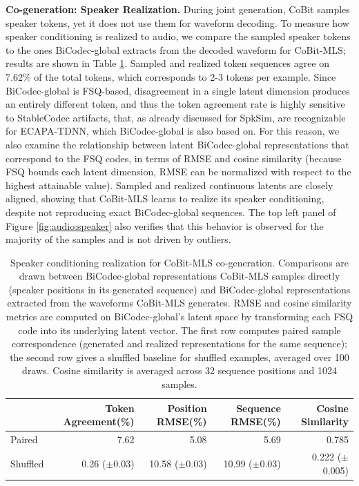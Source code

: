 \textbf{Co-generation: Speaker Realization.} During joint generation, CoBit samples speaker tokens, yet it does not use them for waveform decoding. To measure how speaker conditioning is realized to audio, we compare the sampled speaker tokens to the ones BiCodec-global extracts from the decoded waveform for CoBit-MLS; results are shown in Table \ref{tab:audio:realized-conditioning}. Sampled and realized token sequences agree on 7.62\% of the total tokens, which corresponds to 2-3 tokens per example. Since BiCodec-global is FSQ-based, disagreement in a single latent dimension produces an entirely different token, and thus the token agreement rate is highly sensitive to StableCodec artifacts, that, as already discussed for SpkSim, are recognizable for ECAPA-TDNN, which BiCodec-global is also based on. For this reason, we also examine the relationship between latent BiCodec-global representations that correspond to the FSQ codes, in terms of RMSE and cosine similarity (because FSQ bounds each latent dimension, RMSE can be normalized with respect to the highest attainable value). Sampled and realized continuous latents are closely aligned, showing that CoBit-MLS learns to realize its speaker conditioning, despite not reproducing exact BiCodec-global sequences. The top left panel of Figure \ref{fig:audio:speaker} also verifies that this behavior is observed for the majority of the samples and is not driven by outliers.  

\begin{table}[t]
\centering
\small
\setlength{\tabcolsep}{4.5pt}
\begin{tabular}{lrrrr}
\toprule
& \textbf{Token Agreement(\%)} & \textbf{Position RMSE(\%)} & \textbf{Sequence RMSE(\%)} & \textbf{Cosine Similarity}\\
\midrule
Paired & 7.62 & 5.08 & 5.69 & 0.785 \\
Shuffled & 0.26 ($\pm$0.03) & 10.58 ($\pm$0.03) & 10.99 ($\pm$0.03) & 0.222 ($\pm$0.005) \\
\bottomrule
\end{tabular}
\caption{Speaker conditioning realization for CoBit-MLS co-generation. Comparisons are drawn between BiCodec-global representations CoBit-MLS samples directly (speaker positions in its generated sequence) and BiCodec-global representations extracted from the waveforms CoBit-MLS generates. RMSE and cosine similarity metrics are computed on BiCodec-global's latent space by transforming each FSQ code into its underlying latent vector. The first row computes paired sample correspondence (generated and realized representations for the same sequence); the second row gives a shuffled baseline for shuffled examples, averaged over 100 draws. Cosine similarity is averaged across 32 sequence positions and 1024 samples.}
\label{tab:audio:realized-conditioning}
\end{table}

